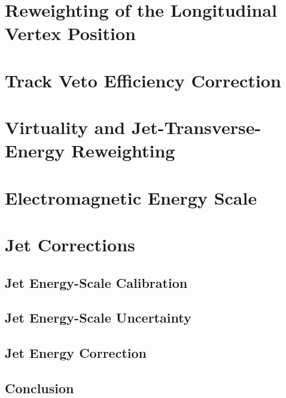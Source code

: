 
 \section{Reweighting of the Longitudinal Vertex Position}
 \label{sec:zvtxrew}
 
 
 \section{Track Veto Efficiency Correction}
 \label{sec:trkvetoeff}
 

\section{Virtuality and Jet-Transverse-Energy Reweighting}
\label{sec:q2etrew}

\newpage
\section{Electromagnetic Energy Scale}
\label{sec:eleenescale}


 \section{Jet Corrections}
 \subsection{Jet Energy-Scale Calibration}
 \label{subsec:jetenescale}
 
  
	\subsection{Jet Energy-Scale Uncertainty}
	\label{subsec:jetenescalcor}
  
	
 \subsection{Jet Energy Correction}
 \label{subsec:jetenecor}
 

 \subsection{Conclusion}
 
  